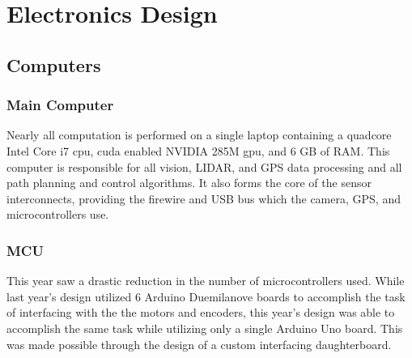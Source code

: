 \section{Electronics Design}

\subsection{Computers}

\subsubsection{Main Computer}

Nearly all computation is performed on a single laptop containing a quadcore Intel Core i7 cpu,
cuda enabled NVIDIA 285M gpu, and 6 GB of RAM. This computer is responsible for all vision,
LIDAR, and GPS data processing and all path planning and control algorithms. It also forms 
the core of the sensor interconnects, providing the firewire and USB bus which the camera, GPS, and
microcontrollers use.

\subsubsection{MCU}

This year saw a drastic reduction in the number of microcontrollers used. While last year's design utilized 6 Arduino Duemilanove boards to accomplish the task of interfacing with the the motors and encoders, this year's design was able to accomplish the same task while utilizing only a single Arduino Uno board. This was made possible through the design of a custom interfacing daughterboard.

